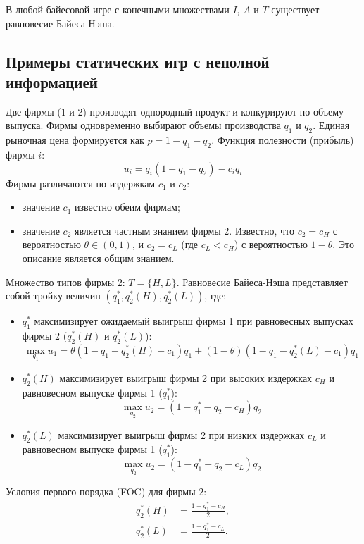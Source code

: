 \begin{theorem}
В любой байесовой игре с конечными множествами $I$, $A$ и $T$ существует равновесие Байеса-Нэша.
\end{theorem}

\subsection{Примеры статических игр с неполной информацией}

\begin{example}
Две фирмы (1 и 2) производят однородный продукт и конкурируют по объему выпуска. Фирмы одновременно выбирают объемы производства $q_1$ и $q_2$. Единая рыночная цена формируется как $p = 1 - q_1 - q_2$. Функция полезности (прибыль) фирмы $i$:
\[
u_i = q_i(1 - q_1 - q_2) - c_i q_i
\]
Фирмы различаются по издержкам $c_1$ и $c_2$:
\begin{itemize}
    \item значение $c_1$ известно обеим фирмам;
    \item значение $c_2$ является частным знанием фирмы 2. Известно, что $c_2 = c_H$ с вероятностью $\theta \in (0, 1)$, и $c_2 = c_L$ (где $c_L < c_H$) с вероятностью $1 - \theta$. Это описание является общим знанием.
\end{itemize}

Множество типов фирмы 2: $T = \{H, L\}$. Равновесие Байеса-Нэша представляет собой тройку величин $(q_1^*, q_2^*(H), q_2^*(L))$, где:
\begin{itemize}
    \item $q_1^*$ максимизирует ожидаемый выигрыш фирмы 1 при равновесных выпусках фирмы 2 ($q_2^*(H)$ и $q_2^*(L)$):
    \[
    \max_{q_1} u_1 = \theta(1 - q_1 - q_2^*(H) - c_1)q_1 + (1 - \theta)(1 - q_1 - q_2^*(L) - c_1)q_1
    \]
    \item $q_2^*(H)$ максимизирует выигрыш фирмы 2 при высоких издержках $c_H$ и равновесном выпуске фирмы 1 ($q_1^*$):
    \[
    \max_{q_2} u_2 = (1 - q_1^* - q_2 - c_H)q_2
    \]
    \item $q_2^*(L)$ максимизирует выигрыш фирмы 2 при низких издержках $c_L$ и равновесном выпуске фирмы 1 ($q_1^*$):
    \[
    \max_{q_2} u_2 = (1 - q_1^* - q_2 - c_L)q_2
    \]
\end{itemize}

Условия первого порядка (FOC) для фирмы 2:
\begin{align*}
    q_2^*(H) &= \frac{1 - q_1^* - c_H}{2}, \\
    q_2^*(L) &= \frac{1 - q_1^* - c_L}{2}.
\end{align*}


\end{example}
